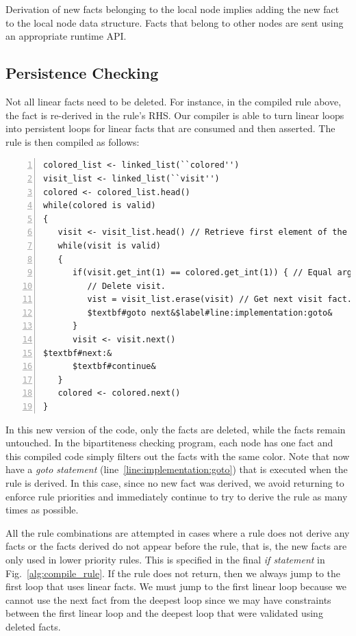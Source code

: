 Derivation of new facts belonging to the local node implies adding the new fact
to the local node data structure. Facts that belong to other nodes are sent
using an appropriate runtime API.

\subsection{Persistence Checking}

Not all linear facts need to be deleted. For instance, in the compiled rule
above, the fact  is re-derived in the rule's RHS.  Our
compiler is able to turn linear loops into persistent loops for linear facts
that are consumed and then asserted. The rule is then compiled as follows:

\begin{Verbatim}[numbers=left,fontsize=\codesize,commandchars=\$\#\&]
colored_list <- linked_list(``colored'')
visit_list <- linked_list(``visit'')
colored <- colored_list.head()
while(colored is valid)
{
   visit <- visit_list.head() // Retrieve first element of the list.
   while(visit is valid)
   {
      if(visit.get_int(1) == colored.get_int(1)) { // Equal arguments?
         // Delete visit.
         vist = visit_list.erase(visit) // Get next visit fact.
         $textbf#goto next&$label#line:implementation:goto&
      }
      visit <- visit.next()
$textbf#next:&
      $textbf#continue&
   }
   colored <- colored.next()
}
\end{Verbatim}

In this new version of the code, only the  facts are deleted, while
the  facts remain untouched. In the bipartiteness checking
program, each node has one  fact and this compiled code simply
filters out the  facts with the same color.  Note that now have a
\emph{goto statement} (line~\ref{line:implementation:goto}) that is executed
when the rule is derived. In this case, since no new  fact was
derived, we avoid returning to enforce rule priorities and immediately continue
to try to derive the rule as many times as possible.

All the rule combinations are attempted in cases where a rule does not derive
any facts or the facts derived do not appear before the rule, that is, the new
facts are only used in lower priority rules. This is specified in the final
\emph{if statement} in Fig.~\ref{alg:compile_rule}. If the rule does not return,
then we always jump to the first loop that uses linear facts. We must jump to
the first linear loop because we cannot use the next fact from the deepest loop
since we may have constraints between the first linear loop and the deepest loop
that were validated using deleted facts.

